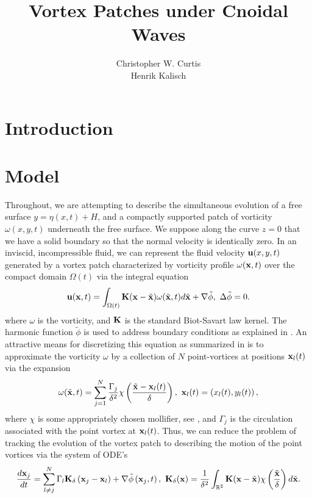\documentclass[a4paper,11pt]{article}
\title{Vortex Patches under Cnoidal Waves}
\author{Christopher W. Curtis\\
Henrik Kalisch}
\date{}
\begin{document}
\maketitle
\section*{Introduction}
\section*{Model}
Throughout, we are attempting to describe the simultaneous evolution of a free surface $y = \eta(x,t) + H$, and a compactly supported patch of vorticity $\omega(x,y,t)$ underneath the free surface.  We suppose along the curve $z=0$ that we have a solid boundary so that the normal velocity is identically zero.  In an inviscid, incompressible fluid, we can represent the fluid velocity ${\bf u}(x,y,t)$ generated by a vortex patch characterized by vorticity profile $\omega({\bf x},t)$ over the compact domain $\Omega(t)$ via the integral equation
\[
{\bf u}({\bf x},t) = \int_{\Omega(t)} {\bf K}({\bf x}-\tilde{{\bf x}})\omega(\tilde{{\bf x}},t)d\tilde{{\bf x}} + \nabla \tilde{\phi}, ~ \Delta \tilde{\phi} = 0.
\]
where $\omega$ is the vorticity, and ${\bf K}$ is the standard Biot-Savart law kernel.  The harmonic function $\tilde{\phi}$ is used to address boundary conditions as explained in \cite{saffman}.  An attractive means for discretizing this equation as summarized in \cite{cottet} is to approximate the vorticity $\omega$ by a collection of $N$ point-vortices at positions ${\bf x}_{l}(t)$ via the expansion
\begin{equation}
\omega(\tilde{{\bf x}},t) = \sum_{j=1}^{N} \frac{\Gamma_{j}}{\delta^{2}}\chi\left(\frac{\tilde{{\bf x}}-{\bf x}_{l}(t)}{\delta}\right), ~ {\bf x}_{l}(t) = \left(x_{l}(t),y_{l}(t) \right),
\label{discvort} 
\end{equation}
where $\chi$ is some appropriately chosen mollifier, see \cite{beale}, and $\Gamma_{j}$ is the circulation associated with the point vortex at ${\bf x}_{l}(t)$.  Thus, we can reduce the problem of tracking the evolution of the vortex patch to describing the motion of the point vortices via the system of ODE's
\[
\frac{d{\bf x}_{j}}{dt}  =  \sum_{l\neq j}^{N} \Gamma_{l} {\bf K}_{\delta}\left({\bf x}_{j}-{\bf x}_{l}\right) + \nabla \tilde{\phi}\left({\bf x}_{j},t\right), ~ {\bf K}_{\delta}({\bf x}) = \frac{1}{\delta^{2}}\int_{\mathbb{R}^{2}}{\bf K}({\bf x} - \tilde{\bf x})\chi \left(\frac{\tilde{{\bf x}}}{\delta} \right) d \tilde{{\bf x}}.
\]
\end{document}
